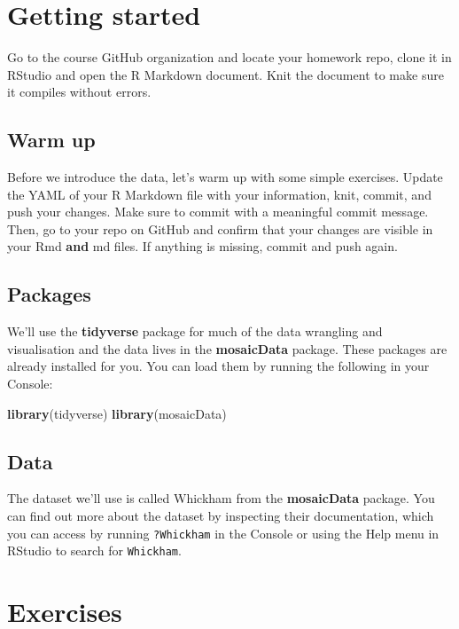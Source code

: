 \documentclass[
]{article}
\newenvironment{Shaded}{\begin{snugshade}}{\end{snugshade}}
\newcommand{\FunctionTok}[1]{\textcolor[rgb]{0.13,0.29,0.53}{\textbf{#1}}}
\newcommand{\NormalTok}[1]{#1}
\begin{document}
\section{Getting started}\label{getting-started}

Go to the course GitHub organization and locate your homework repo,
clone it in RStudio and open the R Markdown document. Knit the document
to make sure it compiles without errors.

\subsection{Warm up}\label{warm-up}

Before we introduce the data, let's warm up with some simple exercises.
Update the YAML of your R Markdown file with your information, knit,
commit, and push your changes. Make sure to commit with a meaningful
commit message. Then, go to your repo on GitHub and confirm that your
changes are visible in your Rmd \textbf{and} md files. If anything is
missing, commit and push again.

\subsection{Packages}\label{packages}

We'll use the \textbf{tidyverse} package for much of the data wrangling
and visualisation and the data lives in the \textbf{mosaicData} package.
These packages are already installed for you. You can load them by
running the following in your Console:

\begin{Shaded}
\begin{Highlighting}[]
\FunctionTok{library}\NormalTok{(tidyverse)}
\FunctionTok{library}\NormalTok{(mosaicData)}
\end{Highlighting}
\end{Shaded}

\subsection{Data}\label{data}

The dataset we'll use is called Whickham from the \textbf{mosaicData}
package. You can find out more about the dataset by inspecting their
documentation, which you can access by running \texttt{?Whickham} in the
Console or using the Help menu in RStudio to search for
\texttt{Whickham}.

\section{Exercises}\label{exercises}
\end{document}
